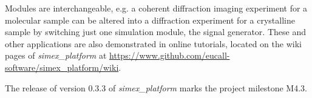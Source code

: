\documentclass[10pt]{scrartcl}
\begin{document}
Modules are interchangeable, e.g. a coherent diffraction
imaging experiment for a molecular sample can be altered into a diffraction
experiment for a crystalline sample by switching just one
simulation module, the signal generator.
These and other applications are also demonstrated in online tutorials, located
on the wiki pages of \textit{simex\_platform} at
\href{https://www.github.com/eucall-software/simex_platform/wiki}{https://www.github.com/eucall-software/simex\_platform/wiki}.

The release of version 0.3.3 of \textit{simex\_platform} \cite{simex0.3.3} marks
the project milestone M4.3.

\printbibliography
\end{document}

